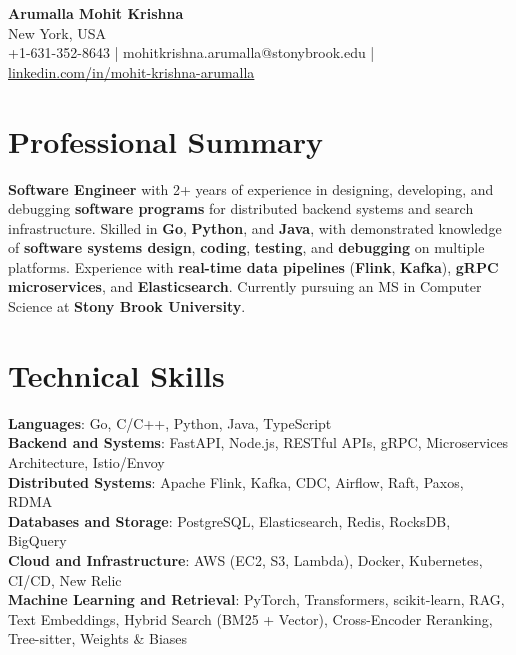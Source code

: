 \documentclass[letterpaper,11pt]{article}
\begin{document}
\begin{center}
  {\Large \textbf{Arumalla Mohit Krishna}} \\
  New York, USA \\
  +1-631-352-8643 \enspace | \enspace mohitkrishna.arumalla@stonybrook.edu \enspace | \enspace \href{https://www.linkedin.com/in/mohit-krishna-arumalla}{linkedin.com/in/mohit-krishna-arumalla}
\end{center}

\section{Professional Summary}
  \begin{itemize}[leftmargin=0.15in, label={}]
    \small{\item{
     \textbf{Software Engineer} with 2+ years of experience in designing, developing, and debugging \textbf{software programs} for distributed backend systems and search infrastructure. Skilled in \textbf{Go}, \textbf{Python}, and \textbf{Java}, with demonstrated knowledge of \textbf{software systems design}, \textbf{coding}, \textbf{testing}, and \textbf{debugging} on multiple platforms. Experience with \textbf{real-time data pipelines} (\textbf{Flink}, \textbf{Kafka}), \textbf{gRPC microservices}, and \textbf{Elasticsearch}. Currently pursuing an MS in Computer Science at \textbf{Stony Brook University}.
    }}
  \end{itemize}
\vspace{-16pt}

\section{Technical Skills}
 \begin{itemize}[leftmargin=0.15in, label={}]
    \small{\item{
     \textbf{Languages}: Go, C/C++, Python, Java, TypeScript \\
     \textbf{Backend and Systems}: FastAPI, Node.js, RESTful APIs, gRPC, Microservices Architecture, Istio/Envoy \\
     \textbf{Distributed Systems}: Apache Flink, Kafka, CDC, Airflow, Raft, Paxos, RDMA \\
     \textbf{Databases and Storage}: PostgreSQL, Elasticsearch, Redis, RocksDB, BigQuery \\
     \textbf{Cloud and Infrastructure}: AWS (EC2, S3, Lambda), Docker, Kubernetes, CI/CD, New Relic \\
     \textbf{Machine Learning and Retrieval}: PyTorch, Transformers, scikit-learn, RAG, Text Embeddings, Hybrid Search (BM25 + Vector), Cross-Encoder Reranking, Tree-sitter, Weights \& Biases
    }}
 \end{itemize}
\vspace{-16pt}
\end{document}
